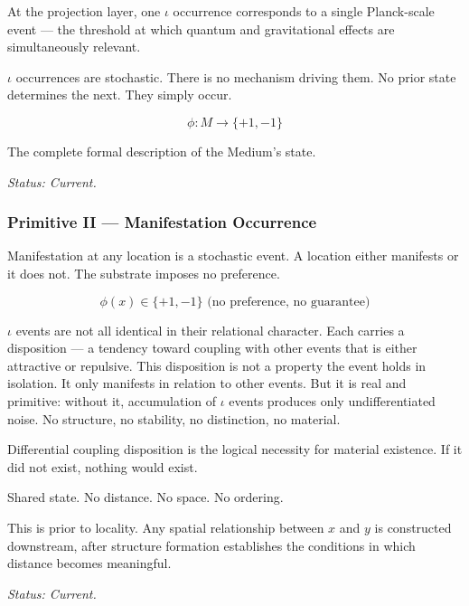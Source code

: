 \documentclass[11pt,letterpaper]{article}
\begin{document}
At the projection layer, one \(\iota\) occurrence corresponds to a single Planck-scale event --- the threshold at which quantum and gravitational effects are simultaneously relevant.

\(\iota\) occurrences are stochastic. There is no mechanism driving them. No prior state determines the next. They simply occur.

\begin{equation}
\phi : M \to \{+1, -1\}
\end{equation}

\begin{center}
The complete formal description of the Medium's state.
\end{center}

\emph{Status: Current.}
\subsubsection{Primitive II --- Manifestation Occurrence}
\label{sec:org19b1ee3}

Manifestation at any location is a stochastic event. A location either manifests or it does not. The substrate imposes no preference.

\begin{equation}
\phi(x) \in \{+1, -1\} \text{ (no preference, no guarantee)}
\end{equation}

\(\iota\) events are not all identical in their relational character. Each carries a disposition --- a tendency toward coupling with other events that is either attractive or repulsive. This disposition is not a property the event holds in isolation. It only manifests in relation to other events. But it is real and primitive: without it, accumulation of \(\iota\) events produces only undifferentiated noise. No structure, no stability, no distinction, no material.

Differential coupling disposition is the logical necessity for material existence. If it did not exist, nothing would exist.

\begin{center}
Shared state. No distance. No space. No ordering.
\end{center}

This is prior to locality. Any spatial relationship between \(x\) and \(y\) is constructed downstream, after structure formation establishes the conditions in which distance becomes meaningful.

\emph{Status: Current.}
\end{document}
